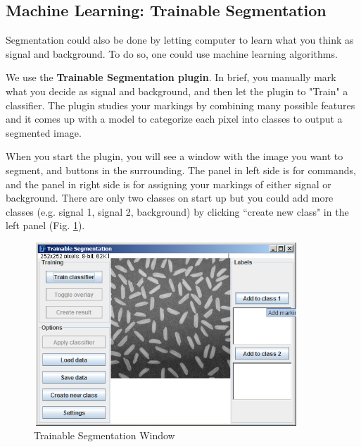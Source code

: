 \subsection{Machine Learning: Trainable Segmentation}

Segmentation could also be done by letting computer to learn what you
think as signal and background. To do so, one could use machine
learning algorithms. 

We use the \textbf{Trainable Segmentation plugin}.
In brief, you manually mark what you decide as signal and background, and then
let the plugin to "Train"
a classifier. The plugin studies your markings by combining many possible features and it comes up with a model to
categorize each pixel into classes to output a segmented image. 
 
When you start the plugin, you
will see a window with the image you want to segment, and buttons in the
surrounding. The panel in left side is for commands, and the panel in right
side is for assigning your markings of either signal or background. There
are only two classes on start up but you could add more classes (e.g.
signal 1, signal 2, background) by clicking ``create new
class" in the left panel (Fig. \ref{fig:img121}). 
\begin{figure}[H]
\begin{center}
\includegraphics[width=9.947cm,height=6.872cm]{fig/CMCIBasicCourse201102-img121.png}
\caption{ Trainable Segmentation Window}
\label{fig:img121}
\end{center}
\end{figure}

